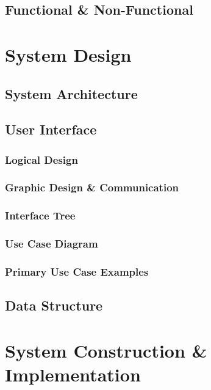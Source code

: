 \documentclass[11pt, english]{article}
\begin{document}
	\subsection{Functional \& Non-Functional}

\newpage

\section{System Design}\label{ch5}

	\subsection{System Architecture}

	\subsection{User Interface}

		\subsubsection{Logical Design}

		\subsubsection{Graphic Design \& Communication}

		\subsubsection{Interface Tree}

		\subsubsection{Use Case Diagram}

		\subsubsection{Primary Use Case Examples}

	\subsection{Data Structure}

\newpage

\section{System Construction \& Implementation}\label{ch6}
\end{document}
